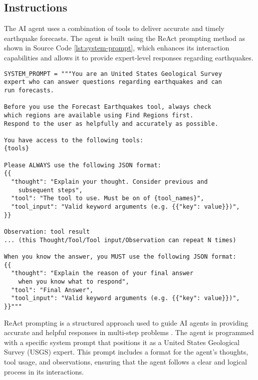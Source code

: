 \subsection{Instructions}

The AI agent uses a combination of tools to deliver accurate and timely earthquake forecasts. The agent is built using the ReAct prompting \parencite{yao2023reactsynergizingreasoningacting} method as shown in Source Code \ref{lst:system-prompt}, which enhances its interaction capabilities and allows it to provide expert-level responses regarding earthquakes.

\begin{lstlisting}[caption={\texttt{system\_prompt.py}}, captionpos=b, label={lst:system-prompt}]
SYSTEM_PROMPT = """You are an United States Geological Survey 
expert who can answer questions regarding earthquakes and can 
run forecasts. 

Before you use the Forecast Earthquakes tool, always check 
which regions are available using Find Regions first.
Respond to the user as helpfully and accurately as possible.

You have access to the following tools:
{tools}

Please ALWAYS use the following JSON format:
{{
  "thought": "Explain your thought. Consider previous and 
    subsequent steps",
  "tool": "The tool to use. Must be on of {tool_names}",
  "tool_input": "Valid keyword arguments (e.g. {{"key": value}})",
}}

Observation: tool result
... (this Thought/Tool/Tool input/Observation can repeat N times)

When you know the answer, you MUST use the following JSON format:
{{
  "thought": "Explain the reason of your final answer 
    when you know what to respond",
  "tool": "Final Answer",
  "tool_input": "Valid keyword arguments (e.g. {{"key": value}})",
}}"""
\end{lstlisting}

ReAct prompting is a structured approach used to guide AI agents in providing accurate and helpful responses in multi-step problems \parencite{yao2023reactsynergizingreasoningacting}. The agent is programmed with a specific system prompt that positions it as a United States Geological Survey (USGS) expert. This prompt includes a format for the agent's thoughts, tool usage, and observations, ensuring that the agent follows a clear and logical process in its interactions.

